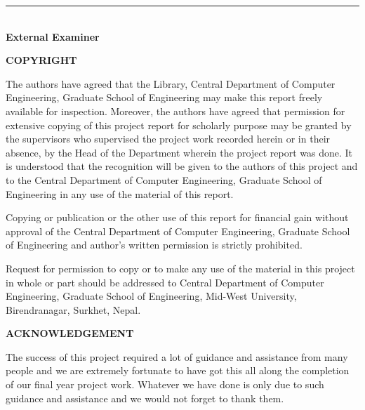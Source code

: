 \documentclass[12pt,a4paper]{report}
\begin{document}
\vspace{1.2cm}

\noindent
\rule{6cm}{0.5pt}\\[4pt]
\textbf{External Examiner}

\newpage

\thispagestyle{plain}
\begin{center}
    {\fontsize{15pt}{18pt}\bfseries COPYRIGHT}\\[1.5cm]
\end{center}

The authors have agreed that the Library, Central Department of Computer Engineering, Graduate School of Engineering may make this report freely available for inspection. Moreover, the authors have agreed that permission for extensive copying of this project report for scholarly purpose may be granted by the supervisors who supervised the project work recorded herein or in their absence, by the Head of the Department wherein the project report was done. It is understood that the recognition will be given to the authors of this project and to the Central Department of Computer Engineering, Graduate School of Engineering in any use of the material of this report.

\vspace{0.5cm}

Copying or publication or the other use of this report for financial gain without approval of the Central Department of Computer Engineering, Graduate School of Engineering and author's written permission is strictly prohibited.

\vspace{0.5cm}

Request for permission to copy or to make any use of the material in this project in whole or part should be addressed to Central Department of Computer Engineering, Graduate School of Engineering, Mid-West University, Birendranagar, Surkhet, Nepal.

\newpage

\thispagestyle{plain}
\begin{center}
    {\fontsize{15pt}{18pt}\bfseries ACKNOWLEDGEMENT}\\[1.5cm]
\end{center}

The success of this project required a lot of guidance and assistance from many people and we are extremely fortunate to have got this all along the completion of our final year project work. Whatever we have done is only due to such guidance and assistance and we would not forget to thank them.
\end{document}
